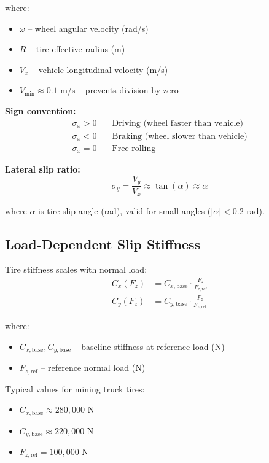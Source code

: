 \documentclass[11pt,a4paper]{article}
\begin{document}
where:
\begin{itemize}
    \item $\omega$ -- wheel angular velocity (rad/s)
    \item $R$ -- tire effective radius (m)
    \item $V_x$ -- vehicle longitudinal velocity (m/s)
    \item $V_{\min} \approx 0.1$ m/s -- prevents division by zero
\end{itemize}

\textbf{Sign convention:}
\begin{align}
\sigma_x > 0 &\quad \text{Driving (wheel faster than vehicle)} \\
\sigma_x < 0 &\quad \text{Braking (wheel slower than vehicle)} \\
\sigma_x = 0 &\quad \text{Free rolling}
\end{align}

\textbf{Lateral slip ratio:}
\begin{equation}
\sigma_y = \frac{V_y}{V_x} \approx \tan(\alpha) \approx \alpha
\end{equation}

where $\alpha$ is tire slip angle (rad), valid for small angles ($|\alpha| < 0.2$ rad).

\subsection{Load-Dependent Slip Stiffness}

Tire stiffness scales with normal load:
\begin{align}
C_x(F_z) &= C_{x,\text{base}} \cdot \frac{F_z}{F_{z,\text{ref}}} \\
C_y(F_z) &= C_{y,\text{base}} \cdot \frac{F_z}{F_{z,\text{ref}}}
\end{align}

where:
\begin{itemize}
    \item $C_{x,\text{base}}, C_{y,\text{base}}$ -- baseline stiffness at reference load (N)
    \item $F_{z,\text{ref}}$ -- reference normal load (N)
\end{itemize}

Typical values for mining truck tires:
\begin{itemize}
    \item $C_{x,\text{base}} \approx 280{,}000$ N
    \item $C_{y,\text{base}} \approx 220{,}000$ N
    \item $F_{z,\text{ref}} = 100{,}000$ N
\end{itemize}
\end{document}
